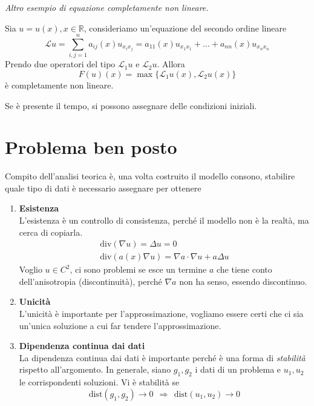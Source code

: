 \documentclass[10pt,a4paper,twoside,openright]{book}
\begin{document}
\begin{itemize}
\begin{itemize}
                    \textit{Altro esempio di equazione completamente non lineare.}

                    Sia $u=u(x),x\in \mathbb{R}$, consideriamo un'equazione del secondo ordine lineare
                    \begin{equation*}
                        \mathcal{L} u=\sum ^{n}_{i,j=1} a_{ij}(x) u_{x_{i} x_{j}} =a_{11}(x) u_{x_{1} x_{1}} +\dotsc +a_{nn}(x) u_{x_{n} x_{n}}
                    \end{equation*}Prendo due operatori del tipo $\mathcal{L}_{1} u$ e $\mathcal{L}_{2} u$. Allora
                    \begin{equation*}
                        F(u)(x) =\max\{\mathcal{L}_{1} u(x),\mathcal{L}_{2} u(x)\}
                    \end{equation*}è completamente non lineare.
          \end{itemize}
\end{itemize}

Se è presente il tempo, si possono assegnare delle condizioni iniziali.
\section{Problema ben posto}

Compito dell'analisi teorica è, una volta costruito il modello consono, stabilire quale tipo di dati è necessario assegnare per ottenere
\begin{enumerate}
    \item \textbf{Esistenza}\\
          L'esistenza è un controllo di consistenza, perché il modello non è la realtà, ma cerca di copiarla.
          \begin{gather*}
              \mathrm{div}(\nabla u) =\Delta u=0\\
              \mathrm{div}(a(x) \nabla u) =\nabla a\cdotp \nabla u+a\Delta u
          \end{gather*}
          Voglio $u\in C^{2}$, ci sono problemi se esce un termine $a$ che tiene conto dell'anisotropia (discontinuità), perché $\nabla a$ non ha senso, essendo discontinuo.

    \item \textbf{Unicità}\\
          L'unicità è importante per l'approssimazione, vogliamo essere certi che ci sia un'unica soluzione a cui far tendere l'approssimazione.

    \item \textbf{Dipendenza continua dai dati}\\
          La dipendenza continua dai dati è importante perché è una forma di \textit{stabilità} rispetto all'argomento. In generale, siano $g_{1},g_{2}$ i dati di un problema e $u_{1},u_{2}$ le corrispondenti soluzioni. Vi è stabilità se
          \begin{equation*}
              \text{dist}(g_{1},g_{2})\rightarrow 0\ \ \Rightarrow \ \ \text{dist}(u_{1},u_{2})\rightarrow 0
          \end{equation*}
\end{enumerate}
\end{document}
